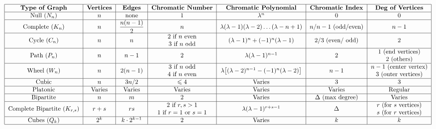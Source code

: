 \documentclass[10pt,landscape]{article}
\renewcommand{\leq}{\leqslant}
\begin{document}
\[
\begin{tabular}{ |c|c|c|c|c|c|c| } 
\hline
\textbf{Type of Graph} & \textbf{Vertices} & \textbf{Edges} & \textbf{Chromatic Number} & \textbf{Chromatic Polynomial} & \textbf{Chromatic Index} & \textbf{Deg of Vertices} \\
\hline
Null $(N_n)$ & $n$  & none & $1$ & $\lambda^n$ & $0$ & $0$ \\
\hline
Complete $(K_n)$ & $n$ & $\displaystyle \frac{n(n-1)}{2}$ & $n$ & $\lambda (\lambda-1)(\lambda-2)\dots(\lambda-n+1)$ & $n/ n-1$ (odd/even) & $n-1$ \\
\hline
Cycle $(C_n)$  & $n$ & $n$ & 
\begin{tabular}{@{}c@{}} 
$2$ if $n$ even \\ $3$ if $n$ odd 
\end{tabular} & $(\lambda - 1)^n + (-1)^n (\lambda - 1)$ & $2/ 3$ (even/ odd) & $2$ \\
\hline
Path $(P_n)$& $n$ & $n-1$ & $2$ & $\lambda (\lambda-1)^{n-1}$ & $2$ & 
\begin{tabular}{@{}c@{}} 
$1$ (end vertices) \\ $2$ (others) 
\end{tabular} \\
\hline
Wheel $(W_n)$ & $n$ & $2(n-1)$ & 
\begin{tabular}{@{}c@{}} 
$3$ if $n$ odd \\ $4$ if $n$ even 
\end{tabular} & $\lambda\big[(\lambda-2)^{n-1}-(-1)^n(\lambda-2)\big]$ & $n-1$ & 
\begin{tabular}{@{}c@{}} 
$n-1$ (center vertex) \\ $3$ (outer vertices) 
\end{tabular} \\
\hline
Cubic & $n$ & $3n/2$ & $\leq 4$ & Varies & $3$ & $3$ \\
\hline
Platonic & Varies & Varies & Varies & Varies & Varies & Regular \\
\hline
Bipartite & $n$ & $m$ & $2$ & Varies & $\Delta$ (max degree) & Varies \\
\hline
Complete Bipartite $(K_{r,s})$ & $r+s$  & $rs$ & 
\begin{tabular}{@{}c@{}} 
$2$ if $r,s > 1$ \\ $1$ if $r = 1$ or $s = 1$
\end{tabular} & $\lambda(\lambda-1)^{r+s-1}$ & $\Delta$ & 
\begin{tabular}{@{}c@{}} 
$r$ (for $s$ vertices) \\ $s$ (for $r$ vertices) 
\end{tabular} \\
\hline
Cubes $(Q_k)$ & $2^k$ & $k \cdot 2^{k-1}$ & $2$ & Varies & $k$ & $k$ \\
\hline
\end{tabular}
\]
\end{document}
